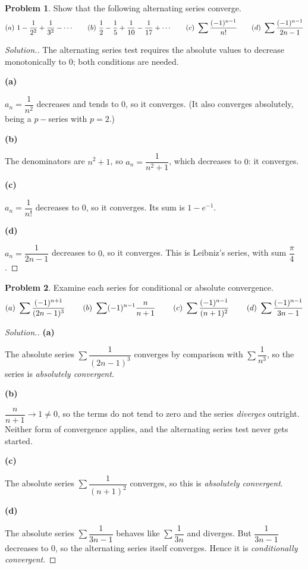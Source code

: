 \documentclass[11pt,a4paper]{article}
\theoremstyle{definition}
\newtheorem{problemx}{Problem}[subsection]
\newenvironment{problem}{\begin{problemx}}{\end{problemx}}
\newenvironment{solution}
  {\renewcommand{\qedsymbol}{}\begin{proof}[\textit{Solution}.]}
  {\end{proof}}
\newcommand{\subhead}[1]{%
  \par\medskip\noindent\textbf{#1}\par\nobreak\smallskip}
\begin{document}
\begin{problem}
Show that the following alternating series converge.
$$(a)\ 1-\frac{1}{2^2}+\frac{1}{3^2}-\cdots\hspace{0.7cm}
(b)\ \frac12-\frac15+\frac{1}{10}-\frac{1}{17}+\cdots\hspace{0.7cm}
(c)\ \sum\frac{(-1)^{n-1}}{n!}\hspace{0.7cm}
(d)\ \sum\frac{(-1)^{n-1}}{2n-1}$$
\end{problem}
\begin{solution}
The alternating series test requires the absolute values to decrease
monotonically to $0$; both conditions are needed.

\subhead{(a)}
$a_n = \dfrac{1}{n^2}$ decreases and tends to $0$, so it converges. (It also
converges absolutely, being a $p-$series with $p=2$.)

\subhead{(b)}
The denominators are $n^2+1$, so $a_n = \dfrac{1}{n^2+1}$, which decreases to
$0$: it converges.

\subhead{(c)}
$a_n = \dfrac{1}{n!}$ decreases to $0$, so it converges. Its sum is
$1 - e^{-1}$.

\subhead{(d)}
$a_n = \dfrac{1}{2n-1}$ decreases to $0$, so it converges. This is Leibniz's
series, with sum $\dfrac{\pi}{4}$.
\end{solution}

\begin{problem}
Examine each series for conditional or absolute convergence.
$$(a)\ \sum\frac{(-1)^{n+1}}{(2n-1)^3}\hspace{0.8cm}
(b)\ \sum(-1)^{n-1}\frac{n}{n+1}\hspace{0.8cm}
(c)\ \sum\frac{(-1)^{n-1}}{(n+1)^2}\hspace{0.8cm}
(d)\ \sum\frac{(-1)^{n-1}}{3n-1}$$
\end{problem}
\begin{solution}
\subhead{(a)}
The absolute series $\sum\dfrac{1}{(2n-1)^3}$ converges by comparison with
$\sum\dfrac{1}{n^3}$, so the series is \emph{absolutely convergent}.

\subhead{(b)}
$\dfrac{n}{n+1}\rightarrow 1 \neq 0$, so the terms do not tend to zero and the
series \emph{diverges} outright. Neither form of convergence applies, and the
alternating series test never gets started.

\subhead{(c)}
The absolute series $\sum\dfrac{1}{(n+1)^2}$ converges, so this is
\emph{absolutely convergent}.

\subhead{(d)}
The absolute series $\sum\dfrac{1}{3n-1}$ behaves like $\sum\dfrac{1}{3n}$ and
diverges. But $\dfrac{1}{3n-1}$ decreases to $0$, so the alternating series
itself converges. Hence it is \emph{conditionally convergent}.
\end{solution}
\end{document}
